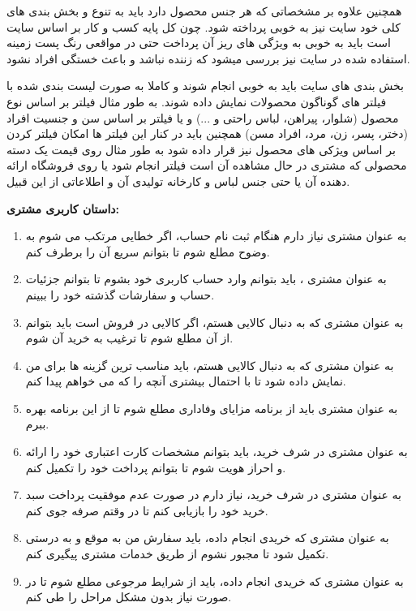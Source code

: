 \documentclass[12pt,a4paper]{article}
\begin{document}
	
	همچنین علاوه بر مشخصاتی که هر جنس محصول دارد باید به تنوع و بخش بندی های کلی خود سایت نیز به خوبی پرداخته شود. چون کل پایه کسب و کار بر اساس سایت است باید به خوبی به ویژگی های ریز آن پرداخت حتی در مواقعی رنگ پست زمینه استفاده شده در سایت نیز بررسی میشود که زننده نباشد و باعث خستگی افراد نشود.
	
	
	بخش بندی های سایت باید به خوبی انجام شوند و کاملا به صورت لیست بندی شده با فیلتر های گوناگون محصولات نمایش داده شوند. به طور مثال فیلتر بر اساس نوع محصول (شلوار، پیراهن، لباس راحتی و ...) و یا فیلتر بر اساس سن و جنسیت افراد (دختر، پسر، زن، مرد، افراد مسن) همچنین باید در کنار این فیلتر ها امکان فیلتر کردن بر اساس ویژکی های محصول نیز قرار داده شود به طور مثال روی قیمت یک دسته محصولی که مشتری در حال مشاهده آن است فیلتر انجام شود یا روی فروشگاه ارائه دهنده آن یا حتی جنس لباس و کارخانه تولیدی آن و اطلاعاتی از این قبیل.
	
\pagebreak	
	

{\large\textbf{}}

\textbf{داستان کاربری مشتری:}

\begin{enumerate}
	\item
به عنوان مشتری نیاز دارم هنگام ثبت نام حساب، اگر خطایی مرتکب می شوم به وضوح مطلع شوم تا بتوانم سریع آن را برطرف کنم.
\item
به عنوان مشتری ، باید بتوانم وارد حساب کاربری خود بشوم تا بتوانم جزئیات حساب و سفارشات گذشته خود را ببینم.
\item
به عنوان مشتری که به دنبال کالایی هستم، اگر کالایی در فروش است باید بتوانم از آن مطلع شوم تا ترغیب به خرید آن شوم.
\item
به عنوان مشتری که به دنبال کالایی هستم، باید مناسب ترین گزینه ها برای من نمایش داده شود تا با احتمال بیشتری آنچه را که می خواهم پیدا کنم.
\item
به عنوان مشتری باید از برنامه مزایای وفاداری مطلع شوم تا از این برنامه بهره ببرم.
\item
به عنوان مشتری در شرف خرید، باید بتوانم مشخصات کارت اعتباری خود را ارائه و احراز هویت شوم تا بتوانم پرداخت خود را تکمیل کنم.
\item
به عنوان مشتری در شرف خرید، نیاز دارم در صورت عدم موفقیت پرداخت سبد خرید خود را بازیابی کنم تا در وقتم صرفه جوی کنم.
\item
به عنوان مشتری که خریدی انجام داده، باید سفارش من به موقع و به درستی تکمیل شود تا مجبور نشوم از طریق خدمات مشتری پیگیری کنم.
\item
به عنوان مشتری که خریدی انجام داده، باید از شرایط مرجوعی مطلع شوم تا در صورت نیاز بدون مشکل مراحل را طی کنم.
\end{enumerate}
\end{document}
